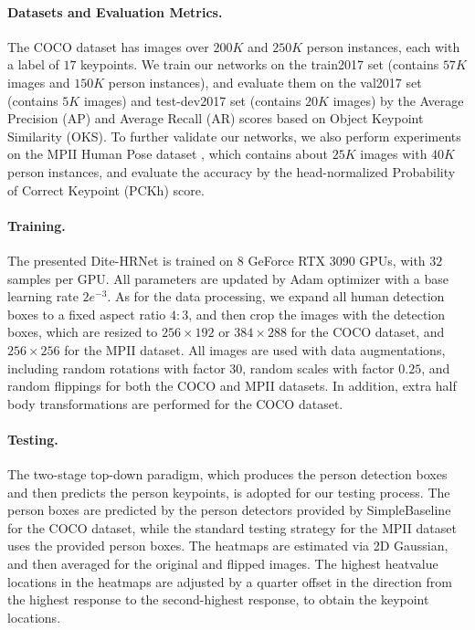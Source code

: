 \documentclass{article}
\begin{document}
\paragraph{Datasets and Evaluation Metrics.} The COCO dataset \cite{lin:coco} has images over $200K$ and $250K$ person instances, each with a label of $17$ keypoints. We train our networks on the train2017 set (contains $57K$ images and $150K$ person instances), and evaluate them on the val2017 set (contains $5K$ images) and test-dev2017 set (contains $20K$ images) by the Average Precision (AP) and Average Recall (AR) scores based on Object Keypoint Similarity (OKS). To further validate our networks, we also perform experiments on the MPII Human Pose dataset \cite{andriluka:mpii}, which contains about $25K$ images with $40K$ person instances, and evaluate the accuracy by the head-normalized Probability of Correct Keypoint (PCKh) score.

\paragraph{Training.} The presented Dite-HRNet is trained on $8$ GeForce RTX 3090 GPUs, with $32$ samples per GPU. All parameters are updated by Adam optimizer with a base learning rate $2e^{-3}$. As for the data processing, we expand all human detection boxes to a fixed aspect ratio $4 \mathbin{:} 3$, and then crop the images with the detection boxes, which are resized to $256 \times 192$ or $384 \times 288$ for the COCO dataset, and $256 \times 256$ for the MPII dataset. All images are used with data augmentations, including random rotations with factor $30$, random scales with factor $0.25$, and random flippings for both the COCO and MPII datasets. In addition, extra half body transformations are performed for the COCO dataset.

\paragraph{Testing.} The two-stage top-down paradigm, which produces the person detection boxes and then predicts the person keypoints, is adopted for our testing process. The person boxes are predicted by the person detectors provided by SimpleBaseline \cite{xiao:simple} for the COCO dataset, while the standard testing strategy for the MPII dataset uses the provided person boxes. The heatmaps are estimated via 2D Gaussian, and then averaged for the original and flipped images. The highest heatvalue locations in the heatmaps are adjusted by a quarter offset in the direction from the highest response to the second-highest response, to obtain the keypoint locations.
\end{document}
